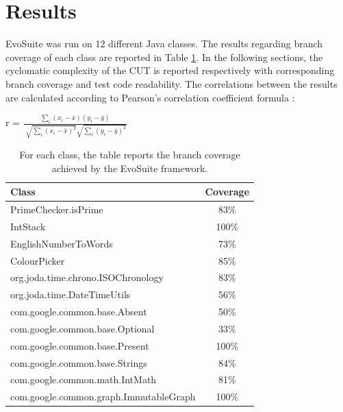 \section{Results} \label{results}

EvoSuite was run on 12 different Java classes.
The results regarding branch coverage of each class are reported in Table \ref{classescov}.
In the following sections, the cyclomatic complexity of the CUT is reported respectively with corresponding branch coverage and test code readability. 
The correlations between the results are calculated according to Pearson's correlation coefficient formula \cite{DEKKING2005}:
\begin{center}
r = 
$
\frac{\displaystyle\sum_{i}(x_i - \bar{x})(y_i - \bar{y})}
{\sqrt[]{\displaystyle\sum_{i}(x_i - \bar{x})^2}\sqrt{\displaystyle\sum_{i}(y_i - \bar{y})^2}}
$
\end{center}

{\setlength{\extrarowheight}{1ex}
\begin{table}[tbp]
\begin{center}
\begin{tabular}{ m{8cm} c }
\hline 
Class & Coverage \\ [0.5ex]
\hline
PrimeChecker.isPrime & 83\% \\ [0.5ex] 
IntStack & 100\%  \\ [0.5ex]
EnglishNumberToWords & 73\%  \\ [0.5ex]
ColourPicker & 85\% \\ [0.5ex]
org.joda.time.chrono.ISOChronology & 83\%  \\ [0.5ex]
org.joda.time.DateTimeUtils & 56\% \\ [0.5ex]
com.google.common.base.Absent & 50\%\\ [0.5ex]
com.google.common.base.Optional & 33\% \\ [0.5ex]
com.google.common.base.Present & 100\% \\ [0.5ex]
com.google.common.base.Strings & 84\% \\ [0.5ex]
com.google.common.math.IntMath & 81\% \\ [0.5ex]
com.google.common.graph.ImmutableGraph & 100\% \\ [0.5ex]
\hline
\end{tabular}
\end{center}
\caption{For each class, the table reports the branch coverage achieved by the EvoSuite framework.}
\label{classescov}
\end{table}
}

